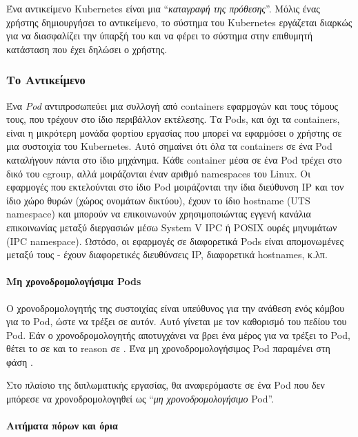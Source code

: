 Ένα αντικείμενο Kubernetes είναι μια ``\textit{καταγραφή της πρόθεσης}''. Μόλις
ένας χρήστης δημιουργήσει το αντικείμενο, το σύστημα του Kubernetes εργάζεται
διαρκώς για να διασφαλίζει την ύπαρξή του και να φέρει το σύστημα στην
επιθυμητή κατάσταση που έχει δηλώσει ο χρήστης.

\subsubsection{Το Αντικείμενο }

Ένα \textit{Pod} αντιπροσωπεύει μια συλλογή από containers εφαρμογών και τους
τόμους τους, που τρέχουν στο ίδιο περιβάλλον εκτέλεσης. Τα Pods, και όχι τα
containers, είναι η μικρότερη μονάδα φορτίου εργασίας που μπορεί να εφαρμόσει ο
χρήστης σε μια συστοιχία του Kubernetes. Αυτό σημαίνει ότι όλα τα containers σε
ένα Pod καταλήγουν πάντα στο ίδιο μηχάνημα. Κάθε container μέσα σε ένα Pod
τρέχει στο δικό του cgroup, αλλά μοιράζονται έναν αριθμό namespaces του Linux.
Οι εφαρμογές που εκτελούνται στο ίδιο Pod μοιράζονται την ίδια διεύθυνση IP και
τον ίδιο χώρο θυρών (χώρος ονομάτων δικτύου), έχουν το ίδιο hostname (UTS
namespace) και μπορούν να επικοινωνούν χρησιμοποιώντας εγγενή κανάλια
επικοινωνίας μεταξύ διεργασιών μέσω System V IPC ή POSIX ουρές μηνυμάτων (IPC
namespace). Ωστόσο, οι εφαρμογές σε διαφορετικά Pods είναι απομονωμένες μεταξύ
τους - έχουν διαφορετικές διευθύνσεις IP, διαφορετικά hostnames, κ.λπ.

\paragraph*{Μη χρονοδρομολογήσιμα Pods}
Ο χρονοδρομολογητής της συστοιχίας είναι υπεύθυνος για την ανάθεση ενός κόμβου
για το Pod, ώστε να τρέξει σε αυτόν. Αυτό γίνεται με τον καθορισμό του πεδίου
 του Pod. Εάν ο χρονοδρομολογητής αποτυγχάνει να βρει ένα
μέρος για να τρέξει το Pod, θέτει το   σε
 και το reason σε . Ένα μη χρονοδρομολογήσιμος Pod
παραμένει στη φάση .

Στο πλαίσιο της διπλωματικής εργασίας, θα αναφερόμαστε σε ένα Pod που δεν
μπόρεσε να χρονοδρομολογηθεί ως ``\textit{μη χρονοδρομολογήσιμο} Pod''.

\paragraph*{Αιτήματα πόρων και όρια}
\label{section:gr-pod-requests}

